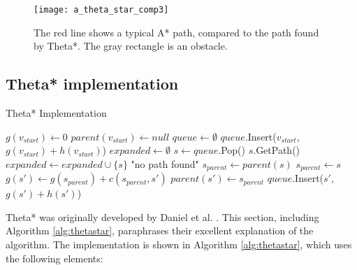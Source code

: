 \begin{figure}
\centering
\texttt{[image: a\_theta\_star\_comp3]}
\caption[A comparison between an A* and Theta* path]{The red line shows a typical A* path, compared to the path found by Theta*. The gray rectangle is an obstacle.}
\label{figure:thetastarcompare}
\end{figure}


\subsection{Theta* implementation}
\begin{algorithm}
\caption{Theta* Implementation}
\label{alg:thetastar}
\begin{algorithmic}[1]
	\State $g(v_{start}) \leftarrow 0$
	\State $parent(v_{start}) \leftarrow null$
	\State $queue \leftarrow \emptyset$
	\State $queue$.Insert($v_{start}$, $g(v_{start}) + h(v_{start})$)
	\State $expanded \leftarrow \emptyset$
		\State $s \leftarrow queue$.Pop()
			\Return $s$.GetPath()
		\EndIf
		\State $expanded \leftarrow expanded \cup \{s\}$
			\EndIf
		\EndFor
	\EndWhile
	\Return "no path found"
\EndFunction
{}
		\State $s_{parent} \leftarrow parent(s)$
	\Else
		\State $s_{parent} \leftarrow s$	
	\EndIf
		\State $g(s') \leftarrow g(s_{parent}) + c(s_{parent},s')$
		\State $parent(s') \leftarrow s_{parent}$
		\State $queue$.Insert($s'$,$g(s') + h(s')$)
	\EndIf
\EndFunction{}
\end{algorithmic}
\end{algorithm}
Theta* was originally developed by Daniel et al. \cite{Daniel2010}. This section, including Algorithm \ref{alg:thetastar}, paraphrases their excellent explanation of the algorithm. The implementation is shown in Algorithm \ref{alg:thetastar}, which uses the following elements:
